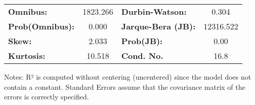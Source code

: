 \begin{center}
\begin{tabular}{lcccccc}
\bottomrule
\end{tabular}
\begin{tabular}{lclc}
\textbf{Omnibus:}       & 1823.266 & \textbf{  Durbin-Watson:     } &     0.304  \\
\textbf{Prob(Omnibus):} &   0.000  & \textbf{  Jarque-Bera (JB):  } & 12316.522  \\
\textbf{Skew:}          &   2.033  & \textbf{  Prob(JB):          } &      0.00  \\
\textbf{Kurtosis:}      &  10.518  & \textbf{  Cond. No.          } &      16.8  \\
\bottomrule
\end{tabular}
\end{center}

Notes: \newline
 [1] R² is computed without centering (uncentered) since the model does not contain a constant. \newline
 [2] Standard Errors assume that the covariance matrix of the errors is correctly specified.